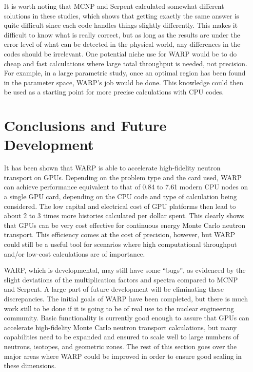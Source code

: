 \documentclass[preprint,12pt]{elsarticle}
\begin{document}
It is worth noting that MCNP and Serpent calculated somewhat different solutions in these studies, which shows that getting exactly the same answer is quite difficult since each code handles things slightly differently.  This makes it difficult to know what is really correct, but as long as the results are under the error level of what can be detected in the physical world, any differences in the codes should be irrelevant.  One potential niche use for WARP would be to do cheap and fast calculations where large total throughput is needed, not precision.  For example, in a large parametric study, once an optimal region has been found in the parameter space, WARP's job would be done.  This knowledge could then be used as a starting point for more precise calculations with CPU codes.



\section{Conclusions and Future Development}
\label{sec:concdev}

It has been shown that WARP is able to accelerate high-fidelity neutron transport on GPUs.  Depending on the problem type and the card used, WARP can achieve performance equivalent to that of 0.84 to 7.61 modern CPU nodes on a single GPU card, depending on the CPU code and type of calculation being considered.  The low capital and electrical cost of GPU platforms then lead to about 2 to 3 times more histories calculated per dollar spent.  This clearly shows that GPUs can be very cost effective for continuous energy Monte Carlo neutron transport.  This efficiency comes at the cost of precision, however, but WARP could still be a useful tool for scenarios where high computational throughput and/or low-cost calculations are of importance.

WARP, which is developmental, may still have some ``bugs'', as evidenced by the slight deviations of the multiplication factors and spectra compared to MCNP and Serpent.  
A large part of future development will be eliminating these discrepancies.  The initial goals of WARP have been completed, but there is much work still to be done if it is going to be of real use to the nuclear engineering community.  Basic functionality is currently good enough to assure that GPUs can accelerate high-fidelity Monte Carlo neutron transport calculations, but many capabilities need to be expanded and ensured to scale well to large numbers of neutrons, isotopes, and geometric zones.  The rest of this section goes over the major areas where WARP could be improved in order to ensure good scaling in these dimensions.    
\end{document}
